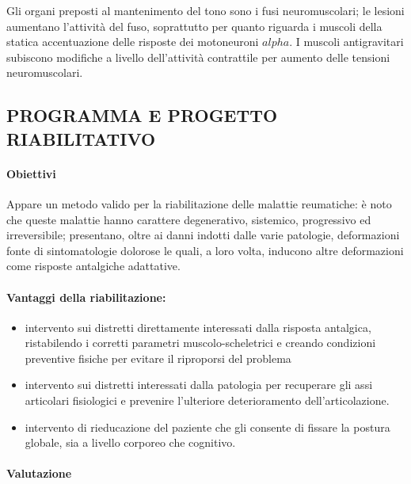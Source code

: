 Gli organi preposti al mantenimento del tono sono i fusi neuromuscolari;
le lesioni aumentano l'attività del fuso, soprattutto per quanto
riguarda i muscoli della statica accentuazione delle risposte dei
motoneuroni $alpha$. I muscoli antigravitari subiscono modifiche a livello
dell'attività contrattile per aumento delle tensioni neuromuscolari.

 
\subsection{PROGRAMMA E PROGETTO RIABILITATIVO}


\paragraph{Obiettivi}

 

Appare un metodo valido per la riabilitazione delle malattie reumatiche:
è noto che queste malattie hanno carattere degenerativo, sistemico,
progressivo ed irreversibile; presentano, oltre ai danni indotti dalle
varie patologie, deformazioni fonte di sintomatologie dolorose le quali,
a loro volta, inducono altre deformazioni come risposte antalgiche
adattative.

\paragraph{Vantaggi della riabilitazione:}
 
 

\begin{itemize}
\item
  intervento sui distretti direttamente interessati dalla risposta
  antalgica, ristabilendo i corretti parametri muscolo-scheletrici e
  creando condizioni preventive fisiche per evitare il riproporsi del
  problema
\item
  intervento sui distretti interessati dalla patologia per recuperare
  gli assi articolari fisiologici e prevenire l'ulteriore deterioramento
  dell'articolazione.
\item 
intervento di rieducazione del paziente che gli consente di fissare
la postura globale, sia a livello corporeo che cognitivo.
\end{itemize}
 
\paragraph{Valutazione}


